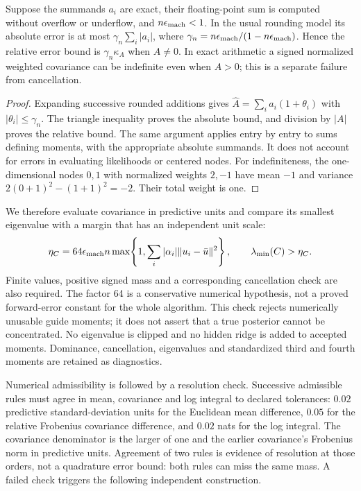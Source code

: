 \begin{proposition}
\label{prop:robust-cancellation}
Suppose the summands $a_i$ are exact, their floating-point sum is computed
without overflow or underflow, and $n\epsilon_{\rm mach}<1$. In the
usual rounding model its absolute error is at most
$\gamma_n\sum_i|a_i|$, where
$\gamma_n=n\epsilon_{\rm mach}/(1-n\epsilon_{\rm mach})$.
Hence the relative error bound is $\gamma_n\kappa_A$ when $A\ne0$.
In exact arithmetic a signed normalized weighted covariance can be
indefinite even when $A>0$; this is a separate failure from cancellation.
\end{proposition}
\begin{proof}
Expanding successive rounded additions gives
$\widehat A=\sum_i a_i(1+\theta_i)$ with
$|\theta_i|\le\gamma_n$. The triangle inequality proves the absolute
bound, and division by $|A|$ proves the relative bound. The same argument
applies entry by entry to sums defining moments, with the appropriate
absolute summands. It does not account for errors in evaluating likelihoods
or centered nodes. For indefiniteness, the one-dimensional nodes $0,1$
with normalized weights $2,-1$ have mean $-1$ and variance
$2(0+1)^2-(1+1)^2=-2$. Their total weight is one.
\end{proof}

We therefore evaluate covariance in predictive units and compare its
smallest eigenvalue with a margin that has an independent unit scale:
\begin{equation}
 \eta_C=64\epsilon_{\rm mach} n
 \max\!\left\{1,\sum_i |\alpha_i|\|u_i-\bar u\|^2\right\},
 \qquad \lambda_{\min}(C)>\eta_C .
 \label{eq:robust-margin}
\end{equation}
Finite values, positive signed mass and a corresponding cancellation check
are also required. The factor 64 is a conservative numerical hypothesis,
not a proved forward-error constant for the whole algorithm. This check
rejects numerically unusable guide moments; it does not assert that a true
posterior cannot be concentrated. No eigenvalue is clipped and no hidden
ridge is added to accepted moments. Dominance, cancellation, eigenvalues
and standardized third and fourth moments are retained as diagnostics.

Numerical admissibility is followed by a resolution check. Successive
admissible rules must agree in mean, covariance and log integral to declared
tolerances: $0.02$ predictive standard-deviation units for the Euclidean
mean difference, $0.05$ for the relative Frobenius covariance difference,
and $0.02$ nats for the log integral. The covariance denominator is the
larger of one and the earlier covariance's Frobenius norm in predictive
units. Agreement of two rules is evidence of resolution at those orders,
not a quadrature error bound: both rules can miss the same mass. A failed
check triggers the following independent construction.

